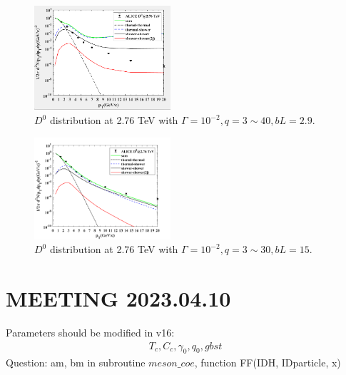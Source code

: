 \documentclass[twocolumn,aps,superscriptaddress,nofootinbib,floatfix]{revtex4}
\begin{document}
 \begin{figure}[H]
	\includegraphics[width=0.45\textwidth]{D0276_q340.png}
	\caption{$D^0$ distribution at 2.76 TeV with $\Gamma=10^{-2}, q=3\sim40, bL=2.9$. }
	\label{fig79}
\end{figure}

 \begin{figure}[H]
	\includegraphics[width=0.45\textwidth]{D0276_q330_bL15.png}
	\caption{$D^0$ distribution at 2.76 TeV with $\Gamma=10^{-2}, q=3\sim30, bL=15$. }
	\label{fig80}
\end{figure}

\section{MEETING 2023.04.10}
Parameters should be modified in v16:
\begin{eqnarray}
	T_c, C_c, \gamma_0, q_0,  gbst
\end{eqnarray}
Question: am, bm in subroutine $meson\_coe$, function FF(IDH, IDparticle, x)
\end{document}
